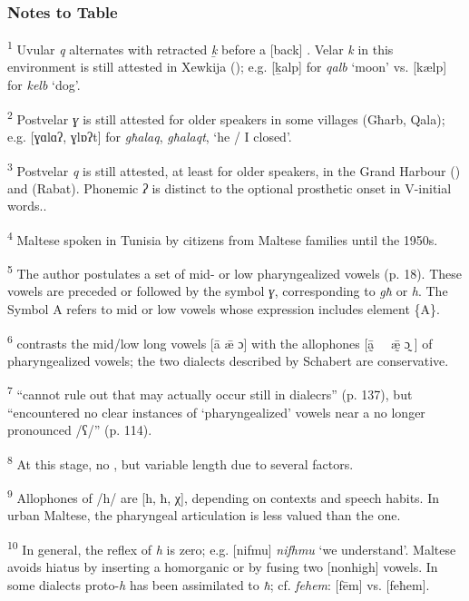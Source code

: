\documentclass[output=paper]{langsci/langscibook}
\begin{document}
\subsubsection*{Notes to Table} 

\noindent
\textsuperscript{1}  Uvular \textit{q} alternates with retracted \textit{ḵ } before a [back] . Velar \textit{k} in this environment is still attested in Xewkija (); e.g. [ḵalp] for \textit{qalb} ‘moon’ vs. [kælp] for \textit{kelb} ‘dog’.

\noindent
\textsuperscript{2}  Postvelar \textit{ɣ} is still attested for older speakers in some  villages (Għarb, Qala); e.g. [ɣɑlɑʔ, ɣlɒʔt] for \textit{għalaq}, \textit{għalaqt}, ‘he / I closed’.

\noindent
\textsuperscript{3} Postvelar \textit{q} is still attested, at least for older speakers, in the Grand Harbour () and  (Rabat). Phonemic \textit{ʔ} is distinct to the optional  prosthetic onset in V-initial words..

\noindent
\textsuperscript{4}  Maltese spoken in Tunisia by  citizens from Maltese families until the 1950s.

\noindent
\textsuperscript{5} The author postulates a set of mid- or low pharyngealized vowels (p. 18). These vowels are preceded or followed by the symbol \textit{ɣ}, corresponding to  \textit{għ} or \textit{h}. The Symbol {\textbar}A{\textbar} refers to mid or low vowels whose  expression includes element \{A\}. 

\noindent
\textsuperscript{6} \citet[19-20]{Schabert1976} contrasts the mid/low long vowels [ā \={æ} ɔ] with the allophones [ā̰ ~~\={æ}̰  ɔ̰ ] of pharyngealized vowels; the two dialects described by Schabert are conservative.  

\noindent
\textsuperscript{7} \citet{AquilinaIsserlin1981} “cannot rule out that  may actually occur still in  dialecrs” (p. 137), but “encountered no clear instances of ‘pharyngealized’ vowels near a no longer pronounced /ʕ/” (p. 114).

\noindent
\textsuperscript{8} At this stage, no , but variable length due to several factors.

\noindent
\textsuperscript{9} Allophones of /h/ are [h, ħ, χ], depending on contexts and speech habits. In urban Maltese, the pharyngeal articulation is less valued than the  one.

\noindent
\textsuperscript{10} In general, the reflex of  \textit{h} is zero; e.g. [nifmu] \textit{nifhmu} ‘we understand’. Maltese avoids hiatus by inserting a homorganic  or by fusing two [nonhigh] vowels. In some dialects proto-\textit{h} has been assimilated to \textit{ħ}; cf. \textit{fehem}: [fēm] vs. [feħem].




 
\sloppy
\printbibliography[heading=subbibliography,notkeyword=this] 
\end{document}
